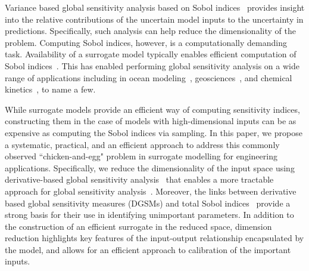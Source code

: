 
Variance based global sensitivity analysis based on Sobol indices~\cite{Sobol93,
Sobol:2001,
Owen13,
SaltelliRattoAndresEtAl08} provides
insight into the relative contributions of the uncertain model inputs to the
uncertainty in predictions. Specifically, such analysis can help reduce the
dimensionality of the problem.  Computing Sobol indices, however, is a
computationally demanding task.  
Availability of a surrogate model typically
enables efficient computation 
of Sobol indices~\cite{Sudret08,CrestauxLeMaitreMartinez09,BlatmanSudret10,HartAlexanderianGremaud17,Sargsyan17}. This has enabled performing global sensitivity analysis
on a wide range of applications including in ocean 
modeling~\cite{AlexanderianWinokurSrajEtAl12,LiIskandaraniLeHenaffEtAl16},
geosciences~\cite{Namhata2016OladyshkinDilmoreEtAl16,deman2016,SaadAlexanderianPrudhommeEtAl17},
and chemical kinetics~\cite{DegasperiGilmore08,navarro2016global,Vohra:2014},
to name a few.

While surrogate models provide an efficient way of computing sensitivity
indices, constructing them in the case of models with high-dimensional inputs
can be as expensive as computing the Sobol indices via sampling. 
In this paper, we propose a systematic, practical, and an efficient
approach to address this commonly observed ``chicken-and-egg" problem
in surrogate modelling for engineering applications.
Specifically, we reduce
the dimensionality of the input space using derivative-based global sensitivity
analysis~\cite{Sobol:2009,Sobol:2010,Lamboni:2013,Kucherenko:2009,Kucherenko:2016}
that enables a more tractable approach for global sensitivity
analysis~\cite{Kucherenko:2016}. Moreover, the links between derivative based
global sensitivity measures (DGSMs) and total Sobol
indices~\cite{Sobol:2009,Kucherenko:2009,Kucherenko:2016} provide a strong
basis for their use in identifying unimportant parameters. In addition
to the construction of an efficient surrogate in the reduced space,
dimension reduction highlights key features of the input-output relationship
encapsulated by the model, and allows for an efficient approach to calibration
of the important inputs. 




